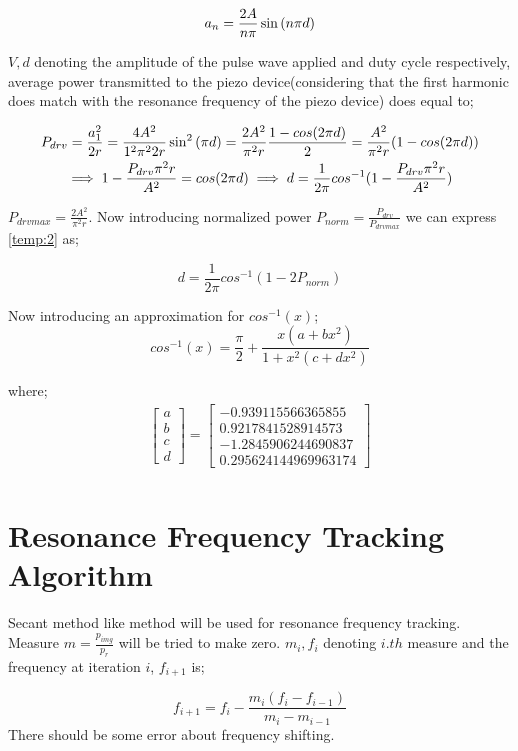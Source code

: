\documentclass{article}
\begin{document}
\begin{equation}{\label{eq:fourierseries}}
    a_n = \frac{2A}{n\pi} \sin{(n \pi d)}
\end{equation}

$V, d$ denoting the amplitude of the pulse wave applied and duty cycle respectively, average power transmitted to the piezo device(considering that the first harmonic does match with the resonance frequency of the piezo device) does equal to;

\begin{multline}{\label{temp:2}}
    P_{drv} = \frac{a_1^2}{2r} = \frac{4A^2}{1^2 \pi^2 2 r} \sin^2{(\pi d)} = \frac{2A^2}{\pi^2 r} \frac{1 - cos(2 \pi d)}{2} = \frac{A^2}{\pi^2 r} (1 - cos(2 \pi d)) \\
    \implies 1 - \frac{P_{drv} \pi^2 r}{A^2} = cos(2 \pi d) \implies d = \frac{1}{2\pi} cos^{-1}(1 - \frac{P_{drv} \pi^2 r}{A^2})
\end{multline}

$P_{drvmax} = \frac{2A^2}{\pi^2 r}$. Now introducing normalized power $P_{norm} = \frac{P_{drv}}{P_{drvmax}}$ we can express \eqref{temp:2} as;

\begin{equation}
    d = \frac{1}{2\pi} cos^{-1}(1 - 2P_{norm})
\end{equation}

Now introducing an approximation for $cos^{-1}(x)$;
\begin{equation}
    cos^{-1}(x) = \frac{\pi}{2} + \frac{x(a + bx^2)}{1 + x^2(c + dx^2)}
\end{equation}

where;
\begin{multline}
    \begin{bmatrix}
        a \\
        b \\
        c \\
        d
    \end{bmatrix}
    =
    \begin{bmatrix}
        -0.939115566365855  \\
        0.9217841528914573  \\
        -1.2845906244690837 \\
        0.295624144969963174
    \end{bmatrix}
    \\
\end{multline}

\section{Resonance Frequency Tracking Algorithm}
Secant method like method will be used for resonance frequency tracking. Measure $m = \frac{p_{img}}{p_r}$ will be tried to make zero.
$m_i, f_i$ denoting $i.th$ measure and the frequency at iteration $i$, $f_{i+1}$ is;

\begin{equation}
    f_{i+1} = f_i - \frac{m_i(f_i - f_{i-1})}{m_i - m_{i-1}}
\end{equation}
There should be some error about frequency shifting.
\end{document}
